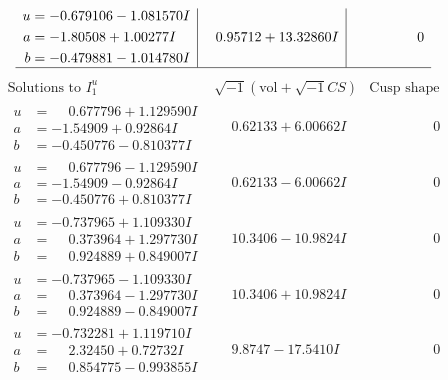 \documentclass[1p]{elsarticle_modified}
\theoremstyle{definition}
\newcommand{\I}{\sqrt{-1}}
\begin{document}
$$\begin{array}{c|c|c}
\begin{aligned}
u &= -0.679106 - 1.081570 I \\
a &= -1.80508 + 1.00277 I \\
b &= -0.479881 - 1.014780 I\end{aligned}
 & \phantom{-}0.95712 + 13.32860 I & \phantom{-0.000000 } 0\\
 \hline 
 \end{array}$$\newpage$$\begin{array}{c|c|c}  
\text{Solutions to }I^u_{1}& \I (\text{vol} + \sqrt{-1}CS) & \text{Cusp shape}\\
 \hline 
\begin{aligned}
u &= \phantom{-}0.677796 + 1.129590 I \\
a &= -1.54909 + 0.92864 I \\
b &= -0.450776 - 0.810377 I\end{aligned}
 & \phantom{-}0.62133 + 6.00662 I & \phantom{-0.000000 } 0 \\ \hline\begin{aligned}
u &= \phantom{-}0.677796 - 1.129590 I \\
a &= -1.54909 - 0.92864 I \\
b &= -0.450776 + 0.810377 I\end{aligned}
 & \phantom{-}0.62133 - 6.00662 I & \phantom{-0.000000 } 0 \\ \hline\begin{aligned}
u &= -0.737965 + 1.109330 I \\
a &= \phantom{-}0.373964 + 1.297730 I \\
b &= \phantom{-}0.924889 + 0.849007 I\end{aligned}
 & \phantom{-}10.3406 - 10.9824 I & \phantom{-0.000000 } 0 \\ \hline\begin{aligned}
u &= -0.737965 - 1.109330 I \\
a &= \phantom{-}0.373964 - 1.297730 I \\
b &= \phantom{-}0.924889 - 0.849007 I\end{aligned}
 & \phantom{-}10.3406 + 10.9824 I & \phantom{-0.000000 } 0 \\ \hline\begin{aligned}
u &= -0.732281 + 1.119710 I \\
a &= \phantom{-}2.32450 + 0.72732 I \\
b &= \phantom{-}0.854775 - 0.993855 I\end{aligned}
 & \phantom{-}9.8747 - 17.5410 I & \phantom{-0.000000 } 0 \\ \hline\begin{aligned}

\end{aligned}
\end{array}$$
\end{document}
